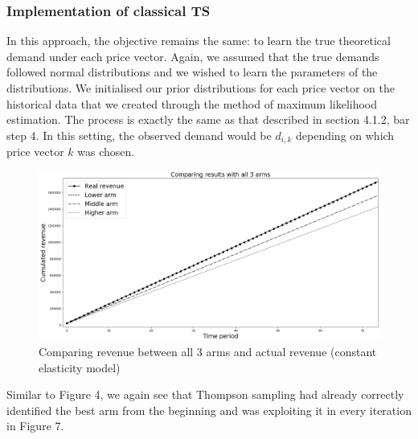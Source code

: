 \documentclass[a4paper]{article}
\begin{document}
\subsubsection{Implementation of classical TS}
In this approach, the objective remains the same: to learn the true theoretical demand under each price vector. Again, we assumed that the true demands followed normal distributions and we wished to learn the parameters of the distributions. We initialised our prior distributions for each price vector on the historical data that we created through the method of maximum likelihood estimation.
\newline
\newline
The process is exactly the same as that described in section 4.1.2, bar step 4. In this setting, the observed demand would be $d_{i,k}$ depending on which price vector $k$ was chosen.
\vfill
\begin{figure}[h!]
	\centering
	\includegraphics[width=1.03\textwidth]{7.png}
	\caption{\label{fig:7}Comparing revenue between all 3 arms and actual revenue (constant elasticity model)}
\end{figure}
\vfill

Similar to Figure 4, we again see that Thompson sampling had already correctly identified the best arm from the beginning and was exploiting it in every iteration in Figure 7.
\end{document}
